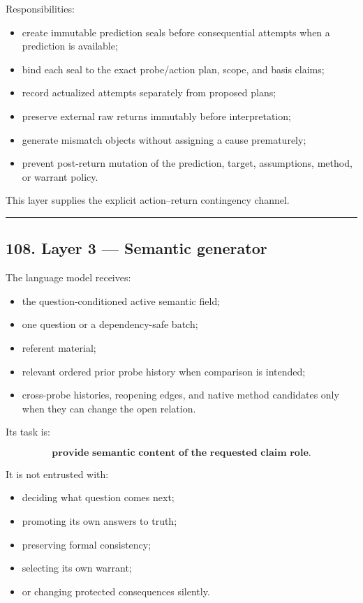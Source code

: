 \documentclass[
]{article}
\providecommand{\tightlist}{%
  \setlength{\itemsep}{0pt}\setlength{\parskip}{0pt}}
\begin{document}
Responsibilities:

\begin{itemize}
\tightlist
\item create immutable prediction seals before consequential attempts when a
  prediction is available;
\item bind each seal to the exact probe/action plan, scope, and basis claims;
\item record actualized attempts separately from proposed plans;
\item preserve external raw returns immutably before interpretation;
\item generate mismatch objects without assigning a cause prematurely;
\item prevent post-return mutation of the prediction, target, assumptions,
  method, or warrant policy.
\end{itemize}

This layer supplies the explicit action--return contingency channel.

\begin{center}\rule{0.5\linewidth}{0.5pt}\end{center}

\subsection{108. Layer 3 --- Semantic
generator}\label{layer-3-semantic-generator}

The language model receives:

\begin{itemize}
\tightlist
\item
  the question-conditioned active semantic field;
\item
  one question or a dependency-safe batch;
\item
  referent material;
\item
  relevant ordered prior probe history when comparison is intended;
\item
  cross-probe histories, reopening edges, and native method candidates only
  when they can change the open relation.
\end{itemize}

Its task is:

\[
\boxed{
\textbf{provide semantic content of the requested claim role.}
}
\]

It is not entrusted with:

\begin{itemize}
\tightlist
\item
  deciding what question comes next;
\item
  promoting its own answers to truth;
\item
  preserving formal consistency;
\item
  selecting its own warrant;
\item
  or changing protected consequences silently.
\end{itemize}
\end{document}
